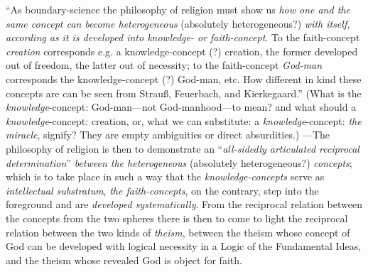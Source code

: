 \documentclass[12pt,a4paper]{book}
\begin{document}
``As boundary-science the philosophy of religion must show us \emph{how one and the same concept can become
heterogeneous} (absolutely heterogeneous?) \emph{with itself, according as it is developed into knowledge- or
faith-concept}. To the faith-concept \emph{creation} corresponds e.g. a knowledge-concept (?) creation, the former
developed out of freedom, the latter out of necessity; to the faith-concept \emph{God-man} corresponds the
knowledge-concept (?) God-man, etc. How different in kind these concepts are can be seen from Strauß, Feuerbach, and
Kierkegaard.'' (What is the \emph{knowledge}-concept: God-man---not God-manhood---to mean? and what should a
\emph{knowledge}-concept: creation, or, what we can substitute: a \emph{knowledge}-concept: \emph{the miracle}, signify? They are
empty ambiguities or direct absurdities.) ---The philosophy of religion is then to demonstrate an ``\emph{all-sidedly
articulated reciprocal determination}'' \emph{between the heterogeneous} (absolutely heterogeneous?) \emph{concepts}; which is to
take place in such a way that the \emph{knowledge-concepts} serve as \emph{intellectual substratum}, \emph{the faith-concepts},
on the contrary, step into the foreground and are \emph{developed systematically}. From the reciprocal relation between the
concepts from the two spheres there is then to come to light the reciprocal relation between the two kinds of \emph{theism},
between the theism whose concept of God can be developed with logical necessity in a Logic of the Fundamental Ideas, and
the theism whose revealed God is object for faith.
\end{document}
